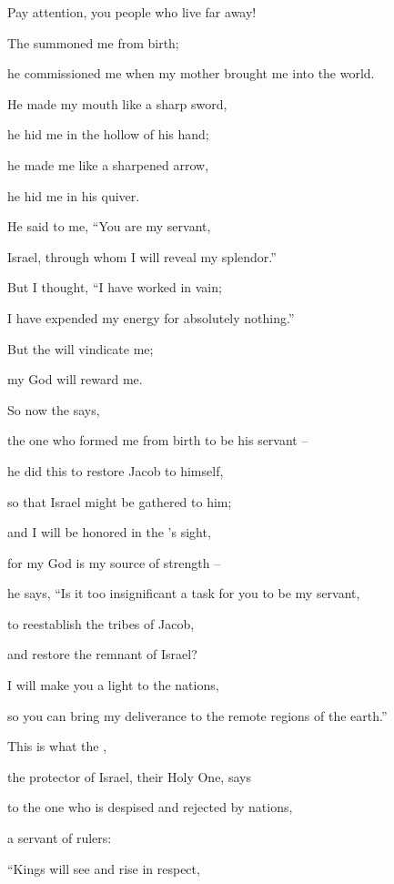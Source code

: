 {\par }{\Q Pay attention,
you people
who live far away!
\par }{\Q The
{}
summoned
me from birth;
\par }{\Q he commissioned me when my mother
brought me into the world.
\par }{\Q {}He made
my mouth
like a sharp
sword,
\par }{\Q he hid
me in the hollow
of his hand;
\par }{\Q he made
me like a sharpened
arrow,
\par }{\Q he hid
me in his quiver.
\par }{\Q {}He said
to me, “You
are my servant,
\par }{\Q Israel,
through whom
I will reveal my splendor.”
\par }{\Q {}But I
thought, “I have worked
in vain;
\par }{\Q I have expended
my energy
for absolutely nothing.”
\par }{\Q But
the {}
will vindicate
me;
\par }{\Q my God
will reward me.
\par }{\Q {}So now
the
{}
says,
\par }{\Q the one who formed
me from birth
to be his servant
–
\par }{\Q he did this to restore
Jacob
to
himself,
\par }{\Q so that Israel
might be gathered
to him;
\par }{\Q and I will be honored
in the
{}’s
sight,
\par }{\Q for my God
is my source
of strength –
\par }{\Q {}he says,
“Is it too insignificant
a task for you to be
my servant,
\par }{\Q to reestablish
the tribes
of Jacob,
\par }{\Q and restore
the remnant
of Israel?

\par }{\Q I will make
you a light
to the nations,
\par }{\Q so
you can bring my deliverance
to
the remote
regions of the earth.”
\par }{\Q {}This is what
the {},
\par }{\Q the protector
of Israel,
their Holy One,
says
\par }{\Q to the one
who is despised
and rejected
by nations,
\par }{\Q a servant
of rulers:
\par }{\Q “Kings
will see
and rise
in respect,

}

